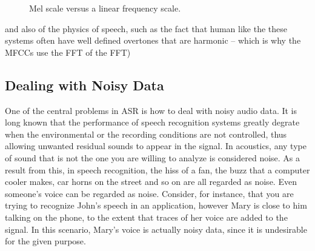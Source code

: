 \begin{figure}[!ht]
        \noindent{}
        \caption{Mel scale versus a linear frequency scale.}\label{fig:mel-scale}
\end{figure}

and also of the physics of speech, such as the fact that human like the these systems often have well defined overtones that are harmonic -- which is why the MFCCs use the FFT of the FFT)


\subsection{Dealing with Noisy Data}

One of the central problems in \ac{ASR} is how to deal with noisy audio data. It is long known that the performance of 
speech recognition systems greatly degrate when the environmental or the recording conditions are not controlled, 
thus allowing unwanted residual sounds to appear in the signal. In acoustics, any type of sound that is not the one
you are willing to analyze is considered noise. As a result from this, in speech recognition, the hiss of a fan, 
the buzz that a computer cooler makes, car horns on the street and so on are all regarded as noise. Even someone's voice
can be regarded as noise. Consider, for instance, that you are trying to recognize John's speech in an application, 
however Mary is close to him talking on the phone, to the extent that traces of her voice are added to the signal. In this
scenario, Mary's voice is actually noisy data, since it is undesirable for the given purpose. 


